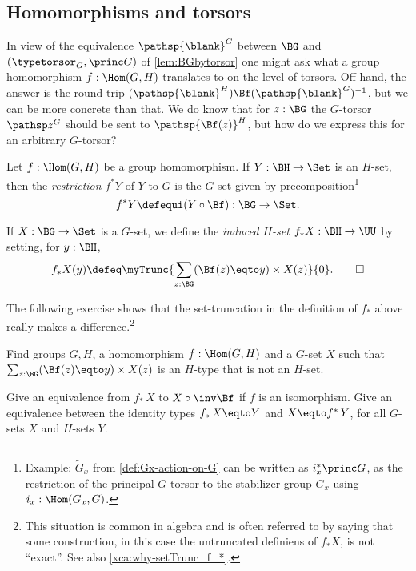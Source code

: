 \subsection{Homomorphisms and torsors}
\label{sec:homotor}
In view of the equivalence $\pathsp{\blank}^G$ between $\BG$ and 
$(\typetorsor_G,\princ G)$ of \cref{lem:BGbytorsor} one might 
ask what a group homomorphism  $f:\Hom(G,H)$ translates to on 
the level of torsors.  Off-hand, the answer is the round-trip 
$(\pathsp{\blank}^H)\Bf(\pathsp{\blank}^G)^{-1}$, but we can be more concrete than that.
We do know that for $z:\BG$ the $G$-torsor $\pathsp z^G$ should be sent to
$\pathsp {\Bf(z)}^H$, but how do we express this for an arbitrary $G$-torsor?
\begin{definition}
  \label{def:restrictandinduce}
  Let $f:\Hom(G,H)$ be a group homomorphism.  If $Y:\BH\to\Set$ is an $H$-set,
  then the \emph{restriction}
  $f^*Y$ of $Y$ to $G$ is the $G$-set given by precomposition\footnote{%
  Example: $\tilde G_x$ from \cref{def:Gx-action-on-G} can
  be written as $i_x^* \princ G$, \ie as the restriction of the
  principal $G$-torsor to the stabilizer group $G_x$ using $i_x:\Hom(G_x,G)$.}
  \[
    f^*Y\defequi (Y\circ\Bf) :\BG\to\Set.
  \]

  If $X:\BG\to\Set$ is a $G$-set, we define
  the \emph{induced $H$-set}
  $f_*X : \BH\to\UU$ by setting, for $y:\BH$,
  \[
    f_*X(y)\defeq\myTrunc{\sum_{z:\BG}(\Bf(z) \eqto y)\times X(z)}{0}.\qedhere
  \]
\end{definition}
The following exercise shows that the set-truncation in the definition
of $f_*$ above really makes a difference.\footnote{%
    This situation is common in algebra and is often referred to by saying
    that some construction, in this case the untruncated
    definiens of $f_*X$, is not ``exact''. See also \cref{xca:why-setTrunc_f_*}.}

\begin{xca}\label{xca:why-setTrunc_f_*}
Find groups $G,H$, a homomorphism $f:\Hom(G,H)$ and a $G$-set $X$ such 
that $\sum_{z:\BG}(\Bf(z) \eqto y)\times X(z)$ is an $H$-type that
is not an $H$-set.
\end{xca}

\begin{xca}\label{xca:id_*-is-id}
    Give an equivalence from $f_*\,X$ to $X\circ\inv\Bf$
    if $f$ is an isomorphism. Give an equivalence between the identity
    types $f_*\,X \eqto Y$ and $X \eqto f^*\,Y$, for all $G$-sets $X$
    and $H$-sets $Y$.
\end{xca}


